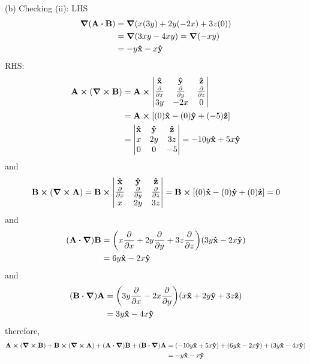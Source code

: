 \documentclass[../main.tex]{subfiles}
\begin{document}
(b) Checking (ii): LHS
\begin{align*}
    \grad(\vb{A} \vdot \vb{B}) &= \grad(x(3y) + 2y(-2x) + 3z(0)) \\
    &= \grad(3xy - 4xy) = \grad(-xy) \\
    &= -y\vu{x} - x\vu{y}
\end{align*}
RHS:
\begin{align*}
    \vb{A} \cp (\curl{\vb{B}}) &= \vb{A} \cp \begin{vmatrix}
        \vu{x} & \vu{y} & \vu{z} \\
        \pdv{x} & \pdv{y} & \pdv{z} \\
        3y & -2x & 0
    \end{vmatrix} \\
    &= \vb{A} \cp [(0)\vu{x} - (0)\vu{y} + (-5)\vu{z}] \\
    &= \begin{vmatrix}
        \vu{x} & \vu{y} & \vu{z} \\
        x & 2y & 3z \\
        0 & 0 & -5
    \end{vmatrix}
    = -10y\vu{x} + 5x\vu{y}
\end{align*}
and
\begin{align*}
    \vb{B} \cp (\curl{\vb{A}}) = \vb{B} \cp \begin{vmatrix}
        \vu{x} & \vu{y} & \vu{z} \\
        \pdv{x} & \pdv{y} & \pdv{z} \\
        x & 2y & 3z
    \end{vmatrix}
    = \vb{B} \cp [(0)\vu{x} - (0)\vu{y} + (0)\vu{z}] = 0
\end{align*}
and
\begin{align*}
    (\vb{A} \vdot \grad) \vb{B} &= \qt(x \pdv{x} + 2y \pdv{y} + 3z \pdv{z})(3y\vu{x} - 2x\vu{y}) \\
    &= 6y \vu{x} - 2x \vu{y}
\end{align*}
and
\begin{align*}
    (\vb{B} \vdot \grad) \vb{A} &= \qt(3y \pdv{x} - 2x \pdv{y})(x\vu{x} + 2y\vu{y} + 3z\vu{z}) \\
    &= 3y \vu{x} - 4x \vu{y}
\end{align*}
therefore,
\begin{align*}
    \vb{A} \cp (\curl{\vb{B}}) + \vb{B} \cp (\curl{\vb{A}})
    + (\vb{A} \vdot \grad) \vb{B} + (\vb{B} \vdot \grad) \vb{A} &= 
    (-10y\vu{x} + 5x\vu{y}) + (6y \vu{x} - 2x \vu{y}) + (3y \vu{x} - 4x \vu{y}) \\
    &= -y\vu{x} - x\vu{y} 
\end{align*}
\end{document}
